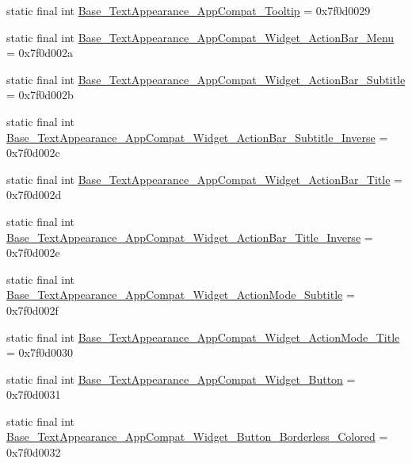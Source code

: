 \begin{DoxyCompactItemize}
\item 
static final int \mbox{\hyperlink{classandroid_1_1support_1_1v7_1_1appcompat_1_1_r_1_1style_a634bdb8186486bedce66c773a4c440ba}{Base\+\_\+\+Text\+Appearance\+\_\+\+App\+Compat\+\_\+\+Tooltip}} = 0x7f0d0029
\item 
static final int \mbox{\hyperlink{classandroid_1_1support_1_1v7_1_1appcompat_1_1_r_1_1style_aa05f850bb2a20365f1c92a78dc494e63}{Base\+\_\+\+Text\+Appearance\+\_\+\+App\+Compat\+\_\+\+Widget\+\_\+\+Action\+Bar\+\_\+\+Menu}} = 0x7f0d002a
\item 
static final int \mbox{\hyperlink{classandroid_1_1support_1_1v7_1_1appcompat_1_1_r_1_1style_a2a6e58456861211a5d6739236375d39c}{Base\+\_\+\+Text\+Appearance\+\_\+\+App\+Compat\+\_\+\+Widget\+\_\+\+Action\+Bar\+\_\+\+Subtitle}} = 0x7f0d002b
\item 
static final int \mbox{\hyperlink{classandroid_1_1support_1_1v7_1_1appcompat_1_1_r_1_1style_a7307f49dc5cf0eee3154ce160a6f4ff7}{Base\+\_\+\+Text\+Appearance\+\_\+\+App\+Compat\+\_\+\+Widget\+\_\+\+Action\+Bar\+\_\+\+Subtitle\+\_\+\+Inverse}} = 0x7f0d002c
\item 
static final int \mbox{\hyperlink{classandroid_1_1support_1_1v7_1_1appcompat_1_1_r_1_1style_a172e7de6432bf1869463c82f2299a826}{Base\+\_\+\+Text\+Appearance\+\_\+\+App\+Compat\+\_\+\+Widget\+\_\+\+Action\+Bar\+\_\+\+Title}} = 0x7f0d002d
\item 
static final int \mbox{\hyperlink{classandroid_1_1support_1_1v7_1_1appcompat_1_1_r_1_1style_a69c4b6d6b5c8b2c1cf77fe514dd5c730}{Base\+\_\+\+Text\+Appearance\+\_\+\+App\+Compat\+\_\+\+Widget\+\_\+\+Action\+Bar\+\_\+\+Title\+\_\+\+Inverse}} = 0x7f0d002e
\item 
static final int \mbox{\hyperlink{classandroid_1_1support_1_1v7_1_1appcompat_1_1_r_1_1style_a1dd69fd2c890662bdfa8c771a70447d3}{Base\+\_\+\+Text\+Appearance\+\_\+\+App\+Compat\+\_\+\+Widget\+\_\+\+Action\+Mode\+\_\+\+Subtitle}} = 0x7f0d002f
\item 
static final int \mbox{\hyperlink{classandroid_1_1support_1_1v7_1_1appcompat_1_1_r_1_1style_a80946fe67e73e49cfbb18f10b23c24df}{Base\+\_\+\+Text\+Appearance\+\_\+\+App\+Compat\+\_\+\+Widget\+\_\+\+Action\+Mode\+\_\+\+Title}} = 0x7f0d0030
\item 
static final int \mbox{\hyperlink{classandroid_1_1support_1_1v7_1_1appcompat_1_1_r_1_1style_a6b427ebdf19f05932f60ad867fb296aa}{Base\+\_\+\+Text\+Appearance\+\_\+\+App\+Compat\+\_\+\+Widget\+\_\+\+Button}} = 0x7f0d0031
\item 
static final int \mbox{\hyperlink{classandroid_1_1support_1_1v7_1_1appcompat_1_1_r_1_1style_a56f489a99ffc73f4465f5931572add30}{Base\+\_\+\+Text\+Appearance\+\_\+\+App\+Compat\+\_\+\+Widget\+\_\+\+Button\+\_\+\+Borderless\+\_\+\+Colored}} = 0x7f0d0032

\end{DoxyCompactItemize}
